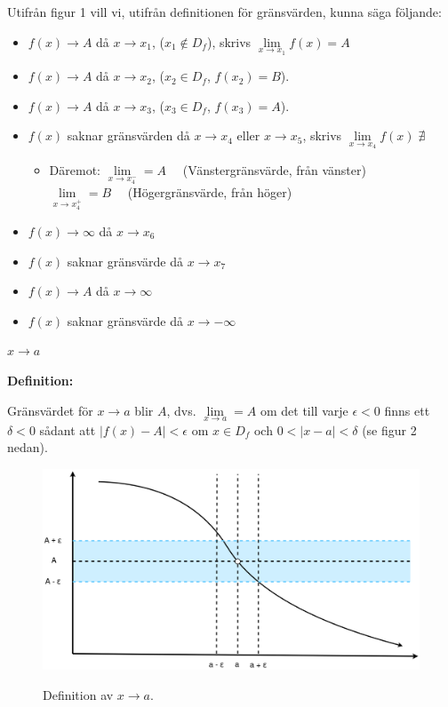\documentclass[swedish]{article}
\begin{document}
Utifrån figur 1 vill vi, utifrån definitionen för gränsvärden, kunna säga följande:

\begin{itemize}
    \item{$f(x) \to A$ då $x \to x_1$, ($x_1 \notin D_f$), skrivs $\lim\limits_{x \to x_1} f(x) = A$}
    \item{$f(x) \to A$ då $x \to x_2$, ($x_2 \in D_f$, $f(x_2) = B$).}
    \item{$f(x) \to A$ då $x \to x_3$, ($x_3 \in D_f$, $f(x_3) = A$).}
    \item{$f(x)$ saknar gränsvärden då $x \to x_4$ eller $x \to x_5$, skrivs $\lim\limits_{x \to x_4} f(x) \; \nexists$}
        \begin{itemize}
            \item{Däremot:
                \smallbreak
                $\lim\limits_{x \to x_4^-} = A \quad$ (Vänstergränsvärde, från vänster)\\

                $\lim\limits_{x \to x_4^+} = B \quad$ (Högergränsvärde, från höger)}
        \end{itemize}
    \smallbreak
    \item{$f(x) \to \infty$ då $x \to x_6$}
    \item{$f(x)$ saknar gränsvärde då $x \to x_7$}
    \item{$f(x) \to A$ då $x \to \infty$}
    \item{$f(x)$ saknar gränsvärde då $x \to -\infty$}
\end{itemize}

\bigbreak

{\large\underline{$x \to a$}}

\smallbreak

\textbf{Definition:}

\smallskip

Gränsvärdet för $x \to a$ blir $A$, dvs. $\lim\limits_{x \to a} = A$ om det till varje $\epsilon < 0$ finns ett $\delta < 0$ sådant att $|f(x) - A| < \epsilon$ om $x \in D_f$ och $0 < |x - a| < \delta$ (se figur 2 nedan). 

\begin{figure}[h!]
    \includegraphics[width=14cm]{figur2.png}
    \label{fig:figur2}
    \caption{Definition av $x \to a$.}
\end{figure}
\end{document}

